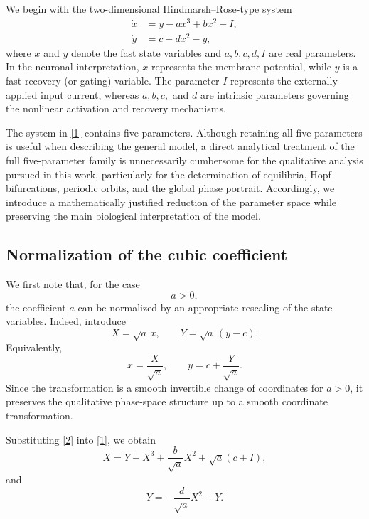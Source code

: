 \documentclass[11pt,a4paper]{article}
\begin{document}
We begin with the two-dimensional Hindmarsh--Rose-type system
\begin{equation}
\boxed{
\begin{aligned}
\dot{x} &= y-a x^3+b x^2+I,\\
\dot{y} &= c-dx^2-y,
\end{aligned}}
\tag{1}
\end{equation}
where $x$ and $y$ denote the fast state variables and
$a,b,c,d,I$ are real parameters. In the neuronal interpretation,
$x$ represents the membrane potential, while $y$ is a fast recovery
(or gating) variable. The parameter $I$ represents the externally
applied input current, whereas $a,b,c,$ and $d$ are intrinsic
parameters governing the nonlinear activation and recovery
mechanisms.

The system in \eqref{1} contains five parameters. Although retaining
all five parameters is useful when describing the general model, a
direct analytical treatment of the full five-parameter family is
unnecessarily cumbersome for the qualitative analysis pursued in
this work, particularly for the determination of equilibria, Hopf
bifurcations, periodic orbits, and the global phase portrait.
Accordingly, we introduce a mathematically justified reduction of the
parameter space while preserving the main biological interpretation
of the model.

\subsection{Normalization of the cubic coefficient}

We first note that, for the case
\begin{equation}
a>0,
\end{equation}
the coefficient $a$ can be normalized by an appropriate rescaling of
the state variables. Indeed, introduce
\begin{equation}
X=\sqrt{a}\,x,
\qquad
Y=\sqrt{a}\,(y-c).
\tag{2}
\end{equation}
Equivalently,
\begin{equation}
x=\frac{X}{\sqrt{a}},
\qquad
y=c+\frac{Y}{\sqrt{a}}.
\end{equation}
Since the transformation is a smooth invertible change of
coordinates for $a>0$, it preserves the qualitative phase-space
structure up to a smooth coordinate transformation.

Substituting \eqref{2} into \eqref{1}, we obtain
\begin{equation}
\dot{X}
=
Y-X^3+\frac{b}{\sqrt{a}}X^2+\sqrt{a}(c+I),
\tag{3}
\end{equation}
and
\begin{equation}
\dot{Y}
=
-\frac{d}{\sqrt{a}}X^2-Y.
\tag{4}
\end{equation}
\end{document}
